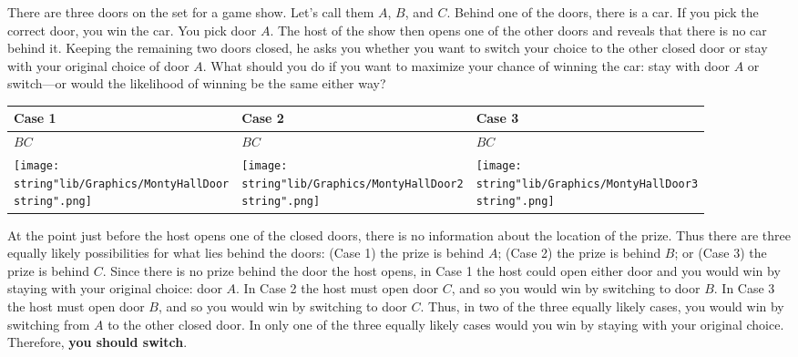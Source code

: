 \documentclass[11pt,a4paper]{book}
\begin{document}
\begin{example}

There are three doors on the set for a game show. Let\textquoteright s
call them $A$, $B$, and $C$. Behind one of the doors, there is
a car. If you pick the correct door, you win the car. You pick door
$A$. The host of the show then opens one of the other doors and reveals
that there is no car behind it. Keeping the remaining two doors closed,
he asks you whether you want to switch your choice to the other closed
door or stay with your original choice of door $A$. What should you
do if you want to maximize your chance of winning the car: stay with
door $A$ or switch---or would the likelihood of winning be the same
either way?

\Solution

\begin{center}
\setlength{\extrarowheight}{2pt}%
\begin{tabular}{|>{\centering}p{4cm}|>{\centering}p{4cm}|>{\centering}p{4cm}|}
\hline
Case 1 & Case 2 & Case 3\tabularnewline
\hline
$B$\hspace{1.3cm}$C$ & $B$\hspace{1.3cm}$C$ & $B$\hspace{1.3cm}$C$\tabularnewline
\texttt{[image: \\string"lib/Graphics/MontyHallDoor\\string".png]} & \texttt{[image: \\string"lib/Graphics/MontyHallDoor2\\string".png]} & \texttt{[image: \\string"lib/Graphics/MontyHallDoor3\\string".png]}\tabularnewline
\hline
\end{tabular}
\par\end{center}

At the point just before the host opens one of the closed doors, there
is no information about the location of the prize. Thus there are
three equally likely possibilities for what lies behind the doors:
(Case 1) the prize is behind $A$; (Case 2) the prize is behind $B$;
or (Case 3) the prize is behind $C$. Since there is no prize behind
the door the host opens, in Case 1 the host could open either door
and you would win by staying with your original choice: door $A$.
In Case 2 the host must open door $C$, and so you would win by switching
to door $B$. In Case 3 the host must open door $B$, and so you would
win by switching to door $C$. Thus, in two of the three equally likely
cases, you would win by switching from $A$ to the other closed door.
In only one of the three equally likely cases would you win by staying
with your original choice. Therefore, \textbf{you should switch}.
\end{example}
\end{document}
